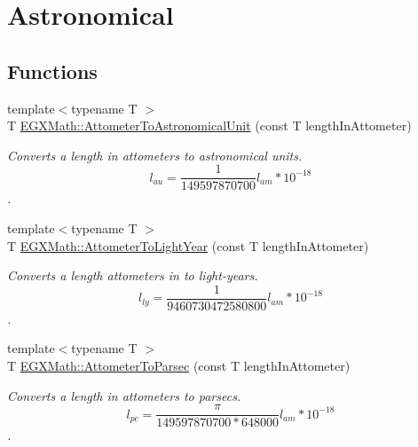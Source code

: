 \hypertarget{group___e_g_x_math-_conversions-_length_conversions-_attometer-_astronomical}{}\section{Astronomical}
\label{group___e_g_x_math-_conversions-_length_conversions-_attometer-_astronomical}
\subsection*{Functions}
\begin{DoxyCompactItemize}
\item 
{\footnotesize template$<$typename T $>$ }\\T \mbox{\hyperlink{group___e_g_x_math-_conversions-_length_conversions-_attometer-_astronomical_ga194198d78186434768016c930eae1933}{E\+G\+X\+Math\+::\+Attometer\+To\+Astronomical\+Unit}} (const T length\+In\+Attometer)
\begin{DoxyCompactList}\small\item\em Converts a length in attometers to astronomical units. \[ l_{au}= \frac{1}{149597870700} l_{am} * 10^{-18}\]. \end{DoxyCompactList}\item 
{\footnotesize template$<$typename T $>$ }\\T \mbox{\hyperlink{group___e_g_x_math-_conversions-_length_conversions-_attometer-_astronomical_gaca916475a6757e4eb793a7f09bbf46b1}{E\+G\+X\+Math\+::\+Attometer\+To\+Light\+Year}} (const T length\+In\+Attometer)
\begin{DoxyCompactList}\small\item\em Converts a length attometers in to light-\/years. \[ l_{ly}= \frac{1}{9460730472580800} l_{am} * 10^{-18} \]. \end{DoxyCompactList}\item 
{\footnotesize template$<$typename T $>$ }\\T \mbox{\hyperlink{group___e_g_x_math-_conversions-_length_conversions-_attometer-_astronomical_ga2f4a0e26e97c60a8f37a1f813d158f48}{E\+G\+X\+Math\+::\+Attometer\+To\+Parsec}} (const T length\+In\+Attometer)
\begin{DoxyCompactList}\small\item\em Converts a length in attometers to parsecs. \[ l_{pc}=\frac{\pi}{149597870700 * 648000} l_{am} * 10^{-18} \]. \end{DoxyCompactList}\end{DoxyCompactItemize}


